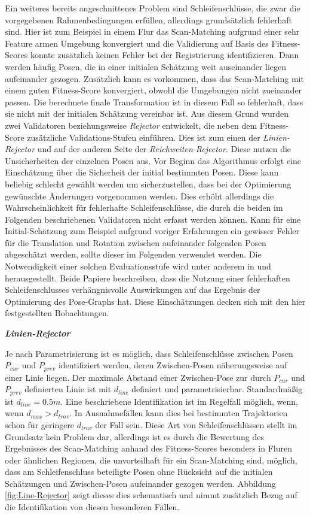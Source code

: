 Ein weiteres bereits angeschnittenes Problem sind Schleifenschlüsse, die zwar die vorgegebenen Rahmenbedingungen erfüllen, allerdings grundsätzlich fehlerhaft sind. Hier ist zum Beispiel in einem Flur das Scan-Matching aufgrund einer sehr Feature armen Umgebung konvergiert und die Validierung auf Basis des Fitness-Scores konnte zusätzlich keinen Fehler bei der Registrierung identifizieren. Dann werden häufig Posen, die in einer initialen Schätzung weit auseinander liegen aufeinander gezogen. Zusätzlich kann es vorkommen, dass das Scan-Matching mit einem guten Fitness-Score konvergiert, obwohl die Umgebungen nicht zueinander passen. Die berechnete finale Transformation ist in diesem Fall so fehlerhaft, dass sie nicht mit der initialen Schätzung vereinbar ist. Aus diesem Grund wurden zwei Validatoren beziehungsweise \emph{Rejector} entwickelt, die neben dem Fitness-Score zusätzliche Validations-Stufen einführen. Dies ist zum einen der \emph{Linien-Rejector} und auf  der anderen Seite der \emph{Reichweiten-Rejector}. Diese nutzen die Unsicherheiten der einzelnen Posen aus. Vor Beginn das Algorithmus erfolgt eine Einschätzung über die Sicherheit der initial bestimmten Posen. Diese kann beliebig schlecht gewählt werden um sicherzustellen, dass bei der Optimierung gewünschte Änderungen vorgenommen werden. Dies erhöht allerdings die Wahrscheinlichkeit für fehlerhafte Schleifenschlüsse, die durch die beiden im Folgenden beschriebenen Validatoren nicht erfasst werden können. Kann für eine Initial-Schätzung zum Beispiel aufgrund voriger Erfahrungen ein gewisser Fehler für die Translation und Rotation zwischen aufeinander folgenden Posen abgeschätzt werden, sollte dieser im Folgenden verwendet werden. Die Notwendigkeit einer solchen Evaluationsstufe wird unter anderem in \cite{tsintotas2022revisiting} und \cite{xie2017graphtinker} herausgestellt. Beide Papiere beschreiben, dass die Nutzung einer fehlerhaften Schleifenschlusses verhängnisvolle Auswirkungen auf das Ergebnis der Optimierung des Pose-Graphs hat. Diese Einschätzungen decken sich mit den hier festgestellten Bobachtungen.

\textbf{\textsl{Linien-Rejector}}

Je nach Parametrisierung ist es möglich, dass Schleifenschlüsse zwischen Posen $P_{cur}$ und $P_{prev}$ identifiziert werden, deren Zwischen-Posen näherungsweise auf einer Linie liegen. Der maximale Abstand einer Zwischen-Pose zur durch $P_{cur}$ und $P_{prev}$ definierten Linie ist mit $d_{line}$ definiert und parametrisierbar. Standardmäßig ist $d_{line} = 0.5m$. Eine beschriebene Identifikation ist im Regelfall möglich, wenn, wenn $d_{max} > d_{trav}$. In Ausnahmefällen kann dies bei bestimmten Trajektorien schon für geringere $d_{trav}$ der Fall sein. Diese Art von Schleifenschlüssen stellt im Grundsatz kein Problem dar, allerdings ist es durch die Bewertung des Ergebnisses des Scan-Matching anhand des Fitness-Scores besonders in Fluren oder ähnlichen Regionen, die unvorteilhaft für ein Scan-Matching sind, möglich, dass am Schleifenschluss beteiligte Posen ohne Rücksicht auf die initialen Schätzungen und Zwischen-Posen aufeinander gezogen werden. Abbildung \ref{fig:Line-Rejector} zeigt dieses dies schematisch und nimmt zusätzlich Bezug auf die Identifikation von diesen besonderen Fällen.

